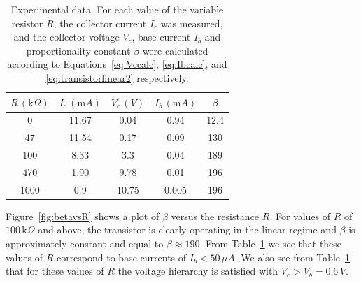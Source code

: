 \documentclass[aps,prl,twocolumn,groupedaddress]{revtex4}
\newcommand{\of}[1]{\left(#1\right)}
\begin{document}
\begin{table}[h]
	\caption{Experimental data.  For each value of the variable resistor $R$, the collector current $I_c$ was measured, and the collector voltage $V_c$, base current $I_b$ and proportionality constant $\beta$ were calculated according to Equations~\ref{eq:Vccalc}, \ref{eq:Ibcalc}, and \ref{eq:transistorlinear2} respectively. }
\begin{ruledtabular}
	\begin{tabular}{ccccc} 
	$R \, \of{\mathrm{k} \Omega}$ & $I_c \, \of{\mathrm{m} A}$ & $V_c \, \of{V}$ & $I_b \, \of{\mathrm{m} A}$ & $\beta$ \\  \hline
	0 & 11.67 & 0.04 &  0.94 &  12.4 \\ 
	47 & 11.54 & 0.17  & 0.09  & 130 \\ 
	100 & 8.33 & 3.3  & 0.04  & 189 \\ 
	470 & 1.90 & 9.78  & 0.01  & 196 \\ 
	1000 & 0.9 & 10.75  & 0.005  & 196 \\ 
	\end{tabular}
	\end{ruledtabular}
	\label{tab:data}
\end{table}





Figure~\ref{fig:betavsR} shows a plot of $\beta$ versus the resistance $R$.  For values of $R$ of $100 \, \mathrm{k}\Omega$ and above, the transistor is clearly operating in the linear regime and $\beta$ is approximately constant and equal to $\beta \approx 190$.  From Table~\ref{tab:data} we see that these values of $R$ correspond to base currents of $I_b < 50 \,  \mu A$.  We also see from Table~\ref{tab:data} that for these values of $R$ the voltage hierarchy is satisfied with $V_c > V_b = 0.6 \, V$.
\end{document}
